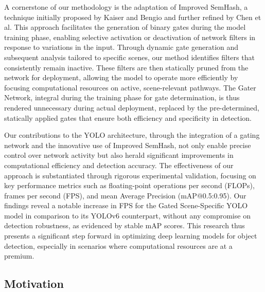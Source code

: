 A cornerstone of our methodology is the adaptation of Improved SemHash, a technique initially proposed by Kaiser and Bengio and further refined by Chen et al. This approach facilitates the generation of binary gates during the model training phase, enabling selective activation or deactivation of network filters in response to variations in the input. Through dynamic gate generation and subsequent analysis tailored to specific scenes, our method identifies filters that consistently remain inactive. These filters are then statically pruned from the network for deployment, allowing the model to operate more efficiently by focusing computational resources on active, scene-relevant pathways. The Gater Network, integral during the training phase for gate determination, is thus rendered unnecessary during actual deployment, replaced by the pre-determined, statically applied gates that ensure both efficiency and specificity in detection.

Our contributions to the YOLO architecture, through the integration of a gating network and the innovative use of Improved SemHash, not only enable precise control over network activity but also herald significant improvements in computational efficiency and detection accuracy. The effectiveness of our approach is substantiated through rigorous experimental validation, focusing on key performance metrics such as floating-point operations per second (FLOPs), frames per second (FPS), and mean Average Precision (mAP@0.5:0.95). Our findings reveal a notable increase in FPS for the Gated Scene-Specific YOLO model in comparison to its YOLOv6 counterpart, without any compromise on detection robustness, as evidenced by stable mAP scores. This research thus presents a significant step forward in optimizing deep learning models for object detection, especially in scenarios where computational resources are at a premium.





\subsection{Motivation}

